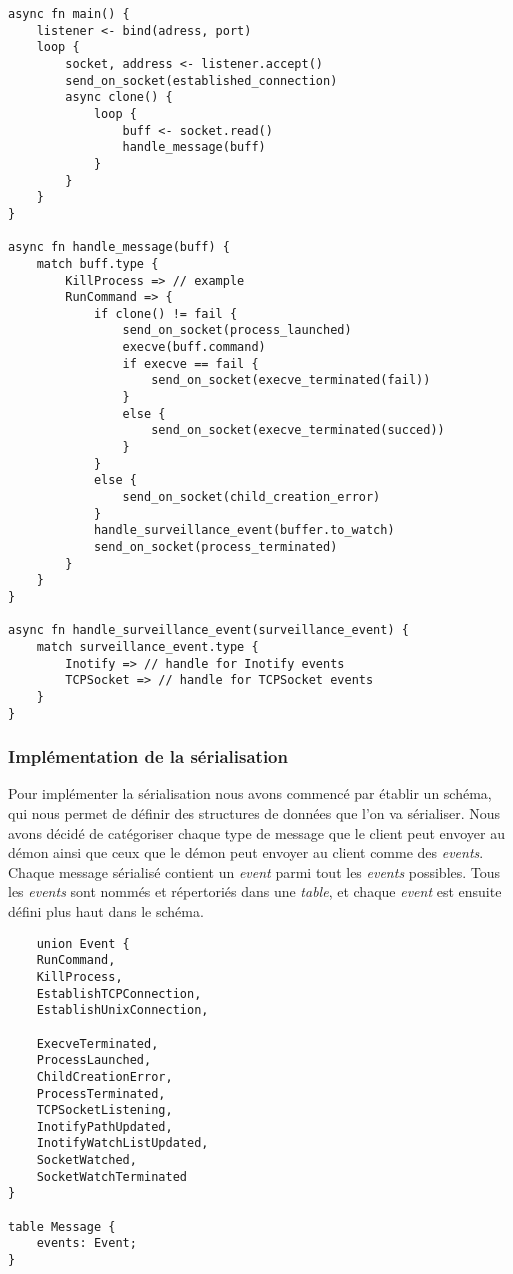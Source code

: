 \documentclass{article}
\begin{document}
\begin{verbatim}
async fn main() {
    listener <- bind(adress, port)
    loop {
        socket, address <- listener.accept()
        send_on_socket(established_connection)
        async clone() {
            loop {
                buff <- socket.read()
                handle_message(buff)
            }
        }
    }
}

async fn handle_message(buff) {
    match buff.type {
        KillProcess => // example
        RunCommand => {
            if clone() != fail {
                send_on_socket(process_launched)
                execve(buff.command)
                if execve == fail {
                    send_on_socket(execve_terminated(fail))
                }
                else {
                    send_on_socket(execve_terminated(succed))
                }
            }
            else {
                send_on_socket(child_creation_error)
            }
            handle_surveillance_event(buffer.to_watch)
            send_on_socket(process_terminated)
        }
    }
}

async fn handle_surveillance_event(surveillance_event) {
    match surveillance_event.type {
        Inotify => // handle for Inotify events
        TCPSocket => // handle for TCPSocket events
    }
}
\end{verbatim}

\subsubsection{Implémentation de la sérialisation}

Pour implémenter la sérialisation nous avons commencé par établir un schéma, qui nous permet de définir des structures de données que l'on va sérialiser.
Nous avons décidé de catégoriser chaque type de message que le client peut envoyer au démon ainsi que ceux que le démon peut envoyer au client comme des \textit{events}. Chaque message sérialisé contient un \textit{event} parmi tout les \textit{events} possibles. Tous les \textit{events} sont nommés et répertoriés dans une \textit{table}, et chaque \textit{event} est ensuite défini plus haut dans le schéma.

\begin{verbatim}
    union Event {
    RunCommand,
    KillProcess,
    EstablishTCPConnection,
    EstablishUnixConnection,

    ExecveTerminated,
    ProcessLaunched,
    ChildCreationError,
    ProcessTerminated,
    TCPSocketListening,
    InotifyPathUpdated,
    InotifyWatchListUpdated,
    SocketWatched,
    SocketWatchTerminated
}

table Message {
    events: Event;
}
\end{verbatim}
\end{document}
